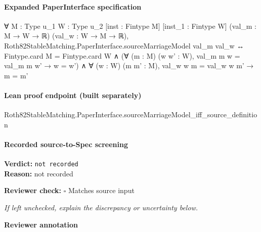 \documentclass[10pt]{article}
\newcommand{\reviewerbox}{%
  \par\noindent\fbox{\parbox{0.96\linewidth}{\rule{0pt}{0.38in}}}\par
}
\newcommand{\reviewmatch}[1]{%
  \par\noindent\textbf{Reviewer check:} $\square$\; #1\par
  \noindent\emph{If left unchecked, explain the discrepancy or uncertainty below.}\par
}
\begin{document}
\paragraph{Expanded PaperInterface specification}
\begin{ReviewVerbatim}
∀ {M : Type u_1} {W : Type u_2} [inst : Fintype M] [inst_1 : Fintype W] (val_m : M → W → ℝ) (val_w : W → M → ℝ),
  Roth82StableMatching.PaperInterface.sourceMarriageModel val_m val_w ↔
    Fintype.card M = Fintype.card W ∧
      (∀ (m : M) (w w' : W), val_m m w = val_m m w' → w = w') ∧ ∀ (w : W) (m m' : M), val_w w m = val_w w m' → m = m'
\end{ReviewVerbatim}

\paragraph{Lean proof endpoint (built separately)}\begin{ReviewVerbatim}
Roth82StableMatching.PaperInterface.sourceMarriageModel_iff_source_definition
\end{ReviewVerbatim}

\paragraph{Recorded source-to-Spec screening}
\textbf{Verdict:} \texttt{not recorded}
\\
\textbf{Reason:} not recorded
\reviewmatch{Matches source input}
\noindent\textbf{Reviewer annotation}\par
\reviewerbox
\end{document}
